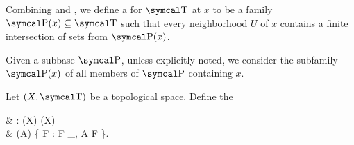 \begin{definition}\label{def:topological_local_subbase}
  Combining  and , we define a  for \( \CT \) at \( x \) to be a family \( \CP(x) \subseteq \CT \) such that every neighborhood \( U \) of \( x \) contains a finite intersection of sets from \( \CP(x) \).

  Given a subbase \( \CP \), unless explicitly noted, we consider the subfamily \( \CP(x) \) of all members of \( \CP \) containing \( x \).
\end{definition}

\begin{definition}\label{def:closure_operator}
  Let \( (X, \CT) \) be a topological space. Define the 
  \begin{BreakableAlign*}
     & \Cl: \Pow(X) \to \Pow(X)                                           \\
     & \Cl(A) \coloneqq \bigcap \{ F : F \in \CF_{\CT}, A \subseteq F \}.
  \end{BreakableAlign*}
\end{definition}

